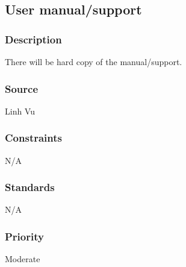 \subsection{User manual/support}
\subsubsection{Description}
There will be hard copy of the manual/support.
\subsubsection{Source}
Linh Vu
\subsubsection{Constraints}
N/A
\subsubsection{Standards}
N/A
\subsubsection{Priority}
Moderate